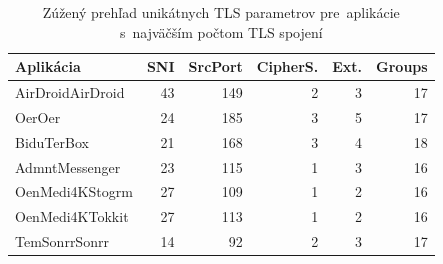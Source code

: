 \begin{table}[H]
    \centering
    \caption{Zúžený prehľad unikátnych TLS parametrov pre~aplikácie s~najväčším počtom TLS spojení}
    \label{tab:app_unique_params}
    \begin{tabular}{lrrrrr}
        \toprule
        \textbf{Aplikácia} & \textbf{SNI} & \textbf{SrcPort} & \textbf{CipherS.} & \textbf{Ext.} & \textbf{Groups} \\ 
        \midrule
        AirDroidAirDroid   & 43 & 149 & 2 & 3 & 17 \\
        OerOer             & 24 & 185 & 3 & 5 & 17 \\
        BiduTerBox         & 21 & 168 & 3 & 4 & 18 \\
        AdmntMessenger     & 23 & 115 & 1 & 3 & 16 \\
        OenMedi4KStogrm    & 27 & 109 & 1 & 2 & 16 \\
        OenMedi4KTokkit    & 27 & 113 & 1 & 2 & 16 \\
        TemSonrrSonrr      & 14 & 92  & 2 & 3 & 17 \\ 
        \bottomrule
    \end{tabular}
\end{table}


